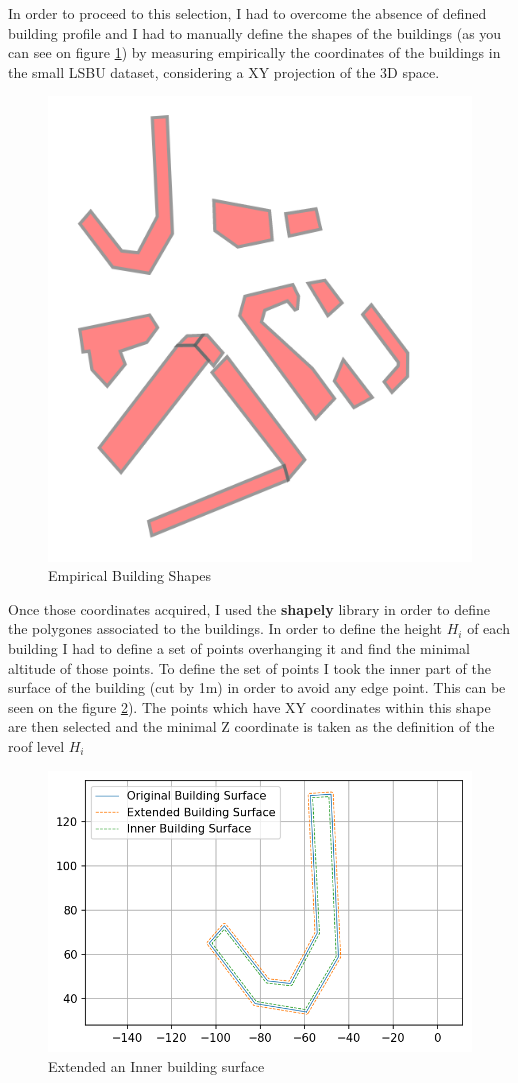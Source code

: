 In order to proceed to this selection, I had to overcome the absence of defined building profile and I had to manually define the shapes of the buildings (as you can see on figure \ref{fig:buildingshapes}) by measuring empirically the coordinates of the buildings in the small LSBU dataset, considering a XY projection of the 3D space. \\

\begin{figure}[h]
\centering
	\includegraphics[width = 0.25 \textwidth]{figures/Subset/buildingShapes_13}
	\caption{Empirical Building Shapes}
	\label{fig:buildingshapes}
\end{figure}

Once those coordinates acquired, I used the \textbf{shapely} library  \citep{noauthor_shapely_2019} in order to define the polygones associated to the buildings. In order to define the height $H_i$ of each building I had to define a set of points overhanging it and find the minimal altitude of those points.  To define the set of points I took the inner part of the surface of the building (cut by 1m) in order to avoid any edge point. This can be seen on the figure \ref{fig:inner_outer_building}). The points which have XY coordinates within this shape are then selected and the minimal Z coordinate is taken as the definition of the roof level $H_i$ \\


\begin{figure}[h]
\centering
	\includegraphics[width = 0.7 \textwidth]{figures/Subset/BuildingSurfaceBuffer}
	\caption{Extended an Inner building surface}
	\label{fig:inner_outer_building}
\end{figure}

